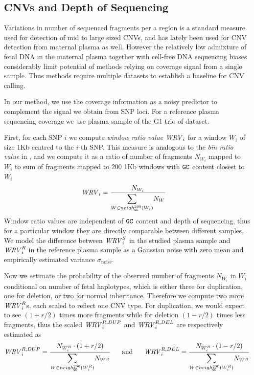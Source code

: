 \subsection{CNVs and Depth of Sequencing}
Variations in number of sequenced fragments per a region is a standard measure used for detection of mid to large sized CNVs, and has lately been used for CNV detection from maternal plasma \cite{srinivasan2013, chen2013} as well. However the relatively low admixture of fetal DNA in the maternal plasma together with cell-free DNA sequencing biases considerably limit potential of methods relying on coverage signal from a single sample. Thus methods \cite{srinivasan2013, chen2013} require multiple datasets to establish a baseline for CNV calling.

In our method, we use the coverage information as a noisy predictor to complement the signal we obtain from SNP loci. For a reference plasma sequencing coverage we use plasma sample of the G1 trio of \cite{kitzman2012} dataset.

First, for each SNP $i$ we compute \emph{window ratio value} $\mathit{WRV}_i$ for a window $W_i$ of size 1Kb centred to the $i$-th SNP. This measure is analogous to the \emph{bin ratio value} in \cite{srinivasan2013}, and we compute it as a ratio of number of fragments $N_{W_i}$ mapped to $W_i$ to sum of fragments mapped to 200 1Kb windows with $\texttt{G}\texttt{C}$ content closest to $W_i$
\begin{align}
\WRV_i &= \frac{ N_{W_i} }{ \mathlarger{\sum_{W \in neigh_{\G\C}^{200}(W_i)}} N_{W} }
\end{align}
Window ratio values are independent of $\texttt{G}\texttt{C}$ content and depth of sequencing, thus for a particular window they are directly comparable between different samples. We model the difference between $\mathit{WRV}_i^S$ in the studied plasma sample and $\mathit{WRV}_i^R$ in the reference plasma sample as a Gaussian noise with zero mean and empirically estimated variance $\sigma_{\text{noise}}$. 

Now we estimate the probability of the observed number of fragments $N_{W_i}$ in $W_i$ conditional on number of fetal haplotypes, which is either three for duplication, one for deletion, or two for normal inheritance. Therefore we compute two more $\mathit{WRV}_i^R$s, each scaled to reflect one CNV type. For duplication, we would expect to see $(1+r/2)$ times more fragments while for deletion $(1-r/2)$ times less fragments, thus the scaled $\mathit{WRV}_i^{R,DUP}$ and $\mathit{WRV}_i^{R,DEL}$ are respectively estimated as
\begin{align}
\WRV_i^{R,DUP} = \frac{ N_{W_i^R} \cdot (1+r/2) }{ \mathlarger{\sum_{W \in neigh_{\G\C}^{200}(W_i^R)}} N_{W^R} }
\text{ ~~~~and~~~~ }
\WRV_i^{R,DEL} = \frac{ N_{W_i^R} \cdot (1-r/2) }{ \mathlarger{\sum_{W \in neigh_{\G\C}^{200}(W_i^R)}} N_{W^R} }
\end{align}

